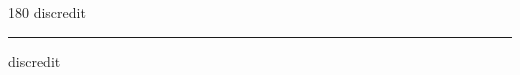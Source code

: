 
\begin{frame}
\begin{center}
\begin{turn}{180}
{\fontsize{2.5cm}{1em}\selectfont discredit}
\end{turn}
\vspace{1em}\par  
\hrule
\vspace{1em}\par  
{\fontsize{2.5cm}{1em}\selectfont discredit}
\end{center}
\end{frame}
